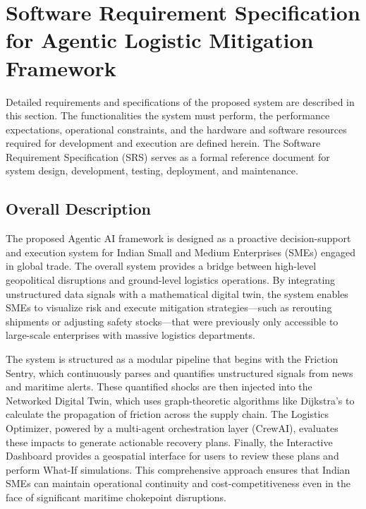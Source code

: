 \chapter[Software Requirement Specification for Agentic Logistic Mitigation Framework]{Software Requirement Specification for Agentic Logistic Mitigation Framework}

Detailed requirements and specifications of the proposed system are described in this section. The functionalities the system must perform, the performance expectations, operational constraints, and the hardware and software resources required for development and execution are defined herein. The Software Requirement Specification (SRS) serves as a formal reference document for system design, development, testing, deployment, and maintenance.

\section[Overall Description]{Overall Description}

The proposed Agentic AI framework is designed as a proactive decision-support and execution system for Indian Small and Medium Enterprises (SMEs) engaged in global trade. The overall system provides a bridge between high-level geopolitical disruptions and ground-level logistics operations. By integrating unstructured data signals with a mathematical digital twin, the system enables SMEs to visualize risk and execute mitigation strategies—such as rerouting shipments or adjusting safety stocks—that were previously only accessible to large-scale enterprises with massive logistics departments.

The system is structured as a modular pipeline that begins with the Friction Sentry, which continuously parses and quantifies unstructured signals from news and maritime alerts. These quantified shocks are then injected into the Networked Digital Twin, which uses graph-theoretic algorithms like Dijkstra's to calculate the propagation of friction across the supply chain. The Logistics Optimizer, powered by a multi-agent orchestration layer (CrewAI), evaluates these impacts to generate actionable recovery plans. Finally, the Interactive Dashboard provides a geospatial interface for users to review these plans and perform What-If simulations. This comprehensive approach ensures that Indian SMEs can maintain operational continuity and cost-competitiveness even in the face of significant maritime chokepoint disruptions.

